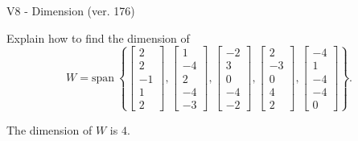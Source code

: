 \begin{exercise}
  \begin{exerciseTitle}V8 - Dimension (ver. 176)\end{exerciseTitle}
  \begin{exerciseStatement}
    Explain how to find the dimension of 
\[W=\mathrm{span}\ \left\{\left[\begin{array}{r}
2 \\
2 \\
-1 \\
1 \\
2
\end{array}\right] , \left[\begin{array}{r}
1 \\
-4 \\
2 \\
-4 \\
-3
\end{array}\right] , \left[\begin{array}{r}
-2 \\
3 \\
0 \\
-4 \\
-2
\end{array}\right] , \left[\begin{array}{r}
2 \\
-3 \\
0 \\
4 \\
2
\end{array}\right] , \left[\begin{array}{r}
-4 \\
1 \\
-4 \\
-4 \\
0
\end{array}\right]\right\}.\]



  \end{exerciseStatement}
  \begin{exerciseAnswer}
   The dimension of \(W\) is  \(4\).
  


  \end{exerciseAnswer}
\end{exercise}